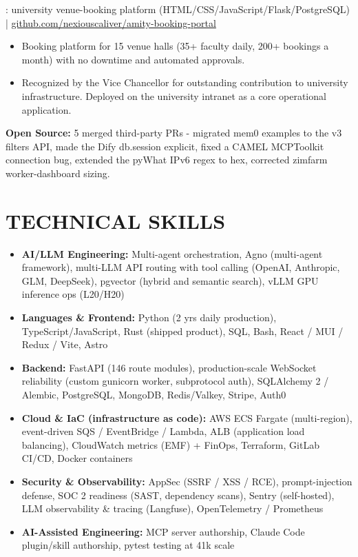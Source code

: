 \documentclass[10pt,a4paper]{article}
\begin{document}
\bigskip
{}: university venue-booking platform (HTML/CSS/JavaScript/Flask/PostgreSQL) |
\href{https://github.com/nexiouscaliver/amity-booking-portal}{github.com/nexiouscaliver/amity-booking-portal}
\begin{itemize}
  \item Booking platform for 15 venue halls (35+ faculty daily, 200+ bookings a month) with
  no downtime and automated approvals.
  \item Recognized by the Vice Chancellor for outstanding contribution to university
  infrastructure. Deployed on the university intranet as a core operational application.
\end{itemize}

{\small \textbf{Open Source:} 5 merged third-party PRs - migrated mem0 examples to the v3 filters API,
made the Dify db.session explicit, fixed a CAMEL MCPToolkit connection bug, extended the pyWhat
IPv6 regex to hex, corrected zimfarm worker-dashboard sizing.}

\section*{TECHNICAL SKILLS}
\begin{itemize}
  \item \textbf{AI/LLM Engineering:} Multi-agent orchestration, Agno (multi-agent framework),
  multi-LLM API routing with tool calling (OpenAI, Anthropic, GLM, DeepSeek), pgvector (hybrid and
  semantic search), vLLM GPU inference ops (L20/H20)
  \item \textbf{Languages \& Frontend:} Python (2 yrs daily production), TypeScript/JavaScript,
  Rust (shipped product), SQL, Bash, React / MUI / Redux / Vite, Astro
  \item \textbf{Backend:} FastAPI (146 route modules), production-scale WebSocket reliability
  (custom gunicorn worker, subprotocol auth), SQLAlchemy 2 / Alembic, PostgreSQL, MongoDB,
  Redis/Valkey, Stripe, Auth0
  \item \textbf{Cloud \& IaC (infrastructure as code):} AWS ECS Fargate (multi-region),
  event-driven SQS / EventBridge / Lambda, ALB (application load balancing), CloudWatch
  metrics (EMF) + FinOps, Terraform, GitLab CI/CD, Docker containers
  \item \textbf{Security \& Observability:} AppSec (SSRF / XSS / RCE),
  prompt-injection defense, SOC 2 readiness (SAST, dependency scans), Sentry (self-hosted),
  LLM observability \& tracing (Langfuse), OpenTelemetry / Prometheus
  \item \textbf{AI-Assisted Engineering:} MCP server authorship, Claude Code plugin/skill
  authorship, pytest testing at 41k scale
\end{itemize}
\end{document}
